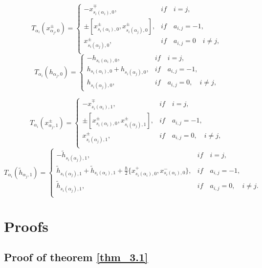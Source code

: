 \documentclass[english]{elsarticle}
\numberwithin{equation}{section}
\begin{document}
\[
T_{\alpha_i}(x_{\alpha_j,0}^{\pm})=
\begin{cases}
         -x_{s_i(\alpha_i),0}^{\mp}, & if \quad i=j,\\
        \pm[x_{s_i(\alpha_i),0}^{\pm},x_{s_i(\alpha_j),0}^{\pm}], & if \quad a_{i,j}=-1,\\
         x_{s_i(\alpha_j),0}^{\pm}, & if \quad a_{i,j}=0\quad i\neq j,\\
\end{cases}
\]
\[
T_{\alpha_i}(h_{\alpha_j,0})=
\begin{cases}
    -h_{s_i(\alpha_i),0}, & if \quad i=j,\\
    h_{s_i(\alpha_i),0}+h_{s_i(\alpha_j),0}, & if \quad a_{i,j}=-1, \\
    h_{s_i(\alpha_j),0}, & if \quad a_{i,j}=0, \quad i \neq j,
\end{cases}
\]

\[
T_{\alpha_i}(x_{\alpha_j,1}^{\pm})=
\begin{cases}
    -x_{s_i(\alpha_i),1}^{\mp}, & if \quad i=j,\\
    \pm[x_{s_i(\alpha_i),0}^{\pm},x_{s_i(\alpha_j),1}^{\pm}], & if \quad a_{i,j}=-1,\\
     x_{s_i(\alpha_j),1}^{\pm}, & if \quad a_{i,j}=0, \quad i \neq j,\\
\end{cases}
\]
\[
T_{\alpha_i}(\tilde{h}_{\alpha_j,1})=
\begin{cases}
    -\tilde{h}_{s_i(\alpha_j),1}, & if \quad i=j,\\
    \tilde{h}_{s_i(\alpha_j),1}+\tilde{h}_{s_i(\alpha_i),1}+\frac{\hbar}{2}\{x_{s_{i}(\alpha_{i}),0}^{+},x_{s_{i}(\alpha_{i}),0}^{-}\}, &if \quad a_{i,j}=-1, \\
    \tilde{h}_{s_i(\alpha_j),1}, & if \quad a_{i,j}=0, \quad i \neq j.\\
\end{cases}
\]


\section{Proofs}

\subsection{Proof of theorem  \ref{thm_3.1}}
\end{document}
